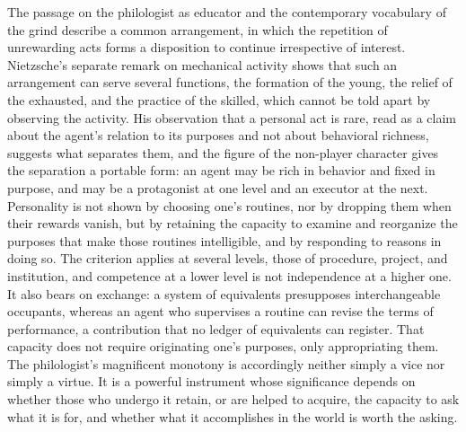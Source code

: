 \documentclass[11pt]{article}
\begin{document}
The passage on the philologist as educator and the contemporary vocabulary of the grind describe a common arrangement, in which the repetition of unrewarding acts forms a disposition to continue irrespective of interest. Nietzsche's separate remark on mechanical activity shows that such an arrangement can serve several functions, the formation of the young, the relief of the exhausted, and the practice of the skilled, which cannot be told apart by observing the activity. His observation that a personal act is rare, read as a claim about the agent's relation to its purposes and not about behavioral richness, suggests what separates them, and the figure of the non-player character gives the separation a portable form: an agent may be rich in behavior and fixed in purpose, and may be a protagonist at one level and an executor at the next. Personality is not shown by choosing one's routines, nor by dropping them when their rewards vanish, but by retaining the capacity to examine and reorganize the purposes that make those routines intelligible, and by responding to reasons in doing so. The criterion applies at several levels, those of procedure, project, and institution, and competence at a lower level is not independence at a higher one. It also bears on exchange: a system of equivalents presupposes interchangeable occupants, whereas an agent who supervises a routine can revise the terms of performance, a contribution that no ledger of equivalents can register. That capacity does not require originating one's purposes, only appropriating them. The philologist's magnificent monotony is accordingly neither simply a vice nor simply a virtue. It is a powerful instrument whose significance depends on whether those who undergo it retain, or are helped to acquire, the capacity to ask what it is for, and whether what it accomplishes in the world is worth the asking.
\end{document}
